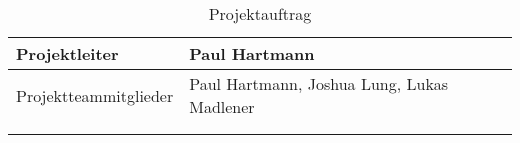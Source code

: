 \begin{longtable}{p{}|p{}}
  Projektleiter         & Paul Hartmann                                                                                  \\
  \hline

  Projektteammitglieder & Paul Hartmann, Joshua Lung, Lukas Madlener                                                     \\
  \hline

  \multicolumn{2}{c}{}                                                                                                   \\

  \caption{Projektauftrag}
  \label{tab:projektauftrag}
\end{longtable}
